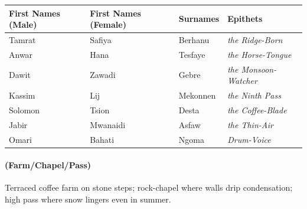 \begin{longtable}{|p{}|p{}|p{}|p{}|}
\hline
\textbf{First Names (Male)} & \textbf{First Names (Female)} & \textbf{Surnames} & \textbf{Epithets} \\
\hline
Tamrat & Safiya & Berhanu & \textit{the Ridge-Born} \\
\hline
Anwar & Hana & Tesfaye & \textit{the Horse-Tongue} \\
\hline
Dawit & Zawadi & Gebre & \textit{the Monsoon-Watcher} \\
\hline
Kassim & Lij & Mekonnen & \textit{the Ninth Pass} \\
\hline
Solomon & Tsion & Desta & \textit{the Coffee-Blade} \\
\hline
Jabir & Mwanaidi & Asfaw & \textit{the Thin-Air} \\
\hline
Omari & Bahati & Ngoma & \textit{Drum-Voice} \\
\hline
\end{longtable}

\paragraph*{(Farm/Chapel/Pass)} Terraced coffee farm on stone steps; rock-chapel where walls drip condensation; high pass where snow lingers even in summer.

